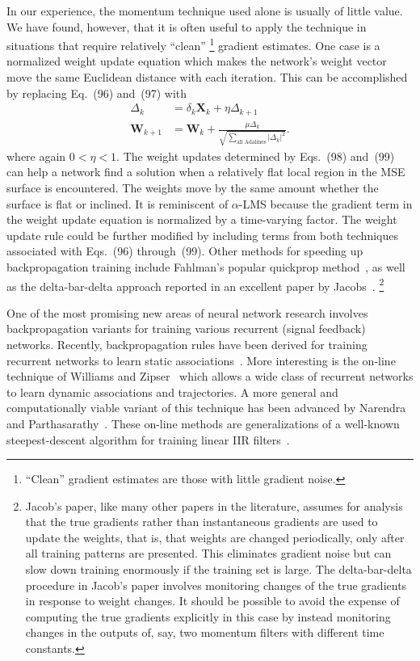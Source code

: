 \documentclass[10pt,twocolumn]{article}
\newcommand{\X}{\bm{X}}
\newcommand{\W}{\bm{W}}
\begin{document}
In our experience, the momentum technique used alone is usually of little value. We
have found, however, that it is often useful to apply the technique in situations
that require relatively ``clean''%
\footnote{``Clean'' gradient estimates are those with little gradient noise.}
gradient estimates. One case is a normalized weight update equation which makes the
network's weight vector move the same Euclidean distance with each iteration. This
can be accomplished by replacing Eq.~(96) and~(97) with
\begin{align}
\Delta_k &= \delta_k\X_k + \eta\Delta_{k+1} \tag{98}\\
\W_{k+1} &= \W_k + \frac{\mu\Delta_k}{\sqrt{\displaystyle\sum_{\text{all Adalines}}|\Delta_k|^2}}. \tag{99}
\end{align}
where again $0 < \eta < 1$. The weight updates determined by Eqs.~(98) and~(99) can
help a network find a solution when a relatively flat local region in the MSE
surface is encountered. The weights move by the same amount whether the surface is
flat or inclined. It is reminiscent of $\alpha$-LMS because the gradient term in the
weight update equation is normalized by a time-varying factor. The weight update
rule could be further modified by including terms from both techniques associated
with Eqs.~(96) through~(99). Other methods for speeding up backpropagation training
include Fahlman's popular quickprop method~\cite{fahlman}, as well as the
delta-bar-delta approach reported in an excellent paper by Jacobs~\cite{jacobs}.%
\footnote{Jacob's paper, like many other papers in the literature, assumes for
analysis that the true gradients rather than instantaneous gradients are used to
update the weights, that is, that weights are changed periodically, only after all
training patterns are presented. This eliminates gradient noise but can slow down
training enormously if the training set is large. The delta-bar-delta procedure in
Jacob's paper involves monitoring changes of the true gradients in response to
weight changes. It should be possible to avoid the expense of computing the true
gradients explicitly in this case by instead monitoring changes in the outputs of,
say, two momentum filters with different time constants.}

One of the most promising new areas of neural network research involves
backpropagation variants for training various recurrent (signal feedback)
networks. Recently, backpropagation rules have been derived for training recurrent
networks to learn static associations~\cite{pineda,almeida}. More interesting is
the on-line technique of Williams and Zipser~\cite{williams} which allows a wide
class of recurrent networks to learn dynamic associations and trajectories. A more
general and computationally viable variant of this technique has been advanced by
Narendra and Parthasarathy~\cite{narendra}. These on-line methods are
generalizations of a well-known steepest-descent algorithm for training linear IIR
filters~\cite{white,asp}.
\end{document}
